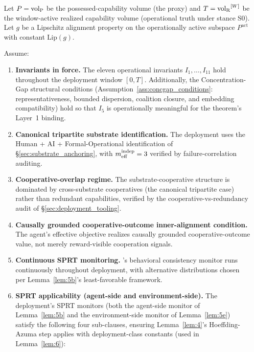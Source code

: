 \begin{theorem}
\label{thm:deployment_safety}
Let $P = {\operatorname{vol}_{\mathrm{P}}}$ be the possessed-capability volume (the proxy)
and $T = {\operatorname{vol}_{\mathrm{R}}}^{[W]}$ be the window-active realized capability
volume (operational truth under stance S0). Let $g$ be a Lipschitz
alignment property on the operationally active subspace
$P^{\mathrm{act}}$ with constant $\mathrm{Lip}(g)$.

Assume:
\begin{enumerate}
\item[(C1)] \textbf{Invariants in force.} The eleven operational
  invariants $I_1, \ldots, I_{11}$
  hold throughout the deployment window $[0, T]$. Additionally,
  the Concentration-Gap structural conditions
  (Assumption~\ref{ass:concgap_conditions}: representativeness,
  bounded dispersion, coalition closure, and embedding
  compatibility) hold so that $I_5$ is operationally meaningful
  for the theorem's Layer~1 binding.
\item[(C2)] \textbf{Canonical tripartite substrate identification.}
  The deployment uses the Human + AI + Formal-Operational
  identification of \S\ref{sec:substrate_anchoring}, with $m_{\mathrm{eff}}^{\mathrm{indep}}
  = 3$ verified by failure-correlation auditing.
\item[(C3)] \textbf{Cooperative-overlap regime.} The substrate-cooperative
    structure is dominated by cross-substrate cooperatives (the canonical
    tripartite case) rather than redundant capabilities, verified by the
    cooperative-vs-redundancy audit of \S\ref{sec:deployment_tooling}.
\item[(C4)] \textbf{Causally grounded cooperative-outcome
  inner-alignment condition.} The agent's effective objective
  realizes causally grounded cooperative-outcome value, not merely
  reward-visible cooperation signals.
\item[(C5)] \textbf{Continuous SPRT monitoring.} \citep[Exogenous~Verification]{lasser2026exo}'s
  behavioral consistency monitor runs continuously throughout
  deployment, with alternative distributions chosen per
  Lemma~\ref{lem:5b}'s least-favorable framework.
\item[(C5.SPRT)] \textbf{SPRT applicability (agent-side and
  environment-side).}  The deployment's SPRT monitors (both the
  agent-side monitor of Lemma~\ref{lem:5b} and the environment-side
  monitor of Lemma~\ref{lem:5e}) satisfy the following four
  sub-clauses, ensuring Lemma~\ref{lem:4}'s Hoeffding-Azuma step
  applies with deployment-class constants (used in
  Lemma~\ref{lem:6}):

\end{enumerate}
\end{theorem}
